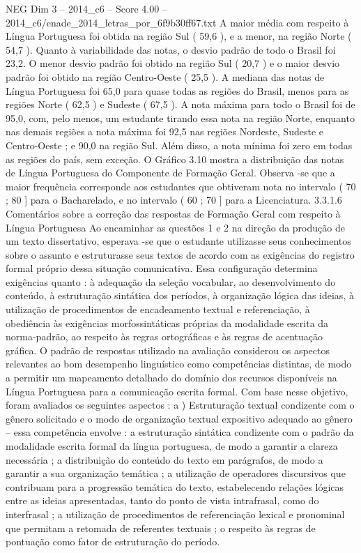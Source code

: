 \begin{textsample}{NEG Dim 3 – 2014\_c6 – Score 4.00 – 2014\_c6/enade\_2014\_letras\_por\_6f9b30ff67.txt}
A maior média com respeito à Língua Portuguesa foi obtida na região Sul ( 59,6 ), e a menor, na região Norte ( 54,7 ).
Quanto à variabilidade das notas, o desvio padrão de todo o Brasil foi 23,2.
O menor desvio padrão foi obtido na região Sul ( 20,7 ) e o maior desvio padrão foi obtido na região Centro-Oeste ( 25,5 ).
A mediana das notas de Língua Portuguesa foi 65,0 para quase todas as regiões do Brasil, menos para as regiões Norte ( 62,5 ) e Sudeste ( 67,5 ).
A nota máxima para todo o Brasil foi de 95,0, com, pelo menos, um estudante tirando essa nota na região Norte, enquanto nas demais regiões a nota máxima foi 92,5 nas regiões Nordeste, Sudeste e Centro-Oeste ; e 90,0 na região Sul.
Além disso, a nota mínima foi zero em todas as regiões do país, sem exceção.
O Gráfico 3.10 mostra a distribuição das notas de Língua Portuguesa do Componente de Formação Geral.
Observa -se que a maior frequência corresponde aos estudantes que obtiveram nota no intervalo ( 70 ; 80 ] para o Bacharelado, e no intervalo ( 60 ; 70 ] para a Licenciatura. 3.3.1.6 Comentários sobre a correção das respostas de Formação Geral com respeito à Língua Portuguesa Ao encaminhar as questões 1 e 2 na direção da produção de um texto dissertativo, esperava -se que o estudante utilizasse seus conhecimentos sobre o assunto e estruturasse seus textos de acordo com as exigências do registro formal próprio dessa situação comunicativa.
Essa configuração determina exigências quanto : à adequação da seleção vocabular, ao desenvolvimento do conteúdo, à estruturação sintática dos períodos, à organização lógica das ideias, à utilização de procedimentos de encadeamento textual e referenciação, à obediência às exigências morfossintáticas próprias da modalidade escrita da norma-padrão, ao respeito às regras ortográficas e às regras de acentuação gráfica.
O padrão de respostas utilizado na avaliação considerou os aspectos relevantes ao bom desempenho linguístico como competências distintas, de modo a permitir um mapeamento detalhado do domínio dos recursos disponíveis na Língua Portuguesa para a comunicação escrita formal.
Com base nesse objetivo, foram avaliados os seguintes aspectos : a ) Estruturação textual condizente com o gênero solicitado e o modo de organização textual expositivo adequado ao gênero – essa competência envolve : a estruturação sintática condizente com o padrão da modalidade escrita formal da língua portuguesa, de modo a garantir a clareza necessária ; a distribuição do conteúdo do texto em parágrafos, de modo a garantir a sua organização temática ; a utilização de operadores discursivos que contribuam para a progressão temática do texto, estabelecendo relações lógicas entre as ideias apresentadas, tanto do ponto de vista intrafrasal, como do interfrasal ; a utilização de procedimentos de referenciação lexical e pronominal que permitam a retomada de referentes textuais ; o respeito às regras de pontuação como fator de estruturação do período.

\end{textsample}
